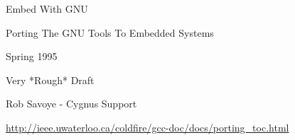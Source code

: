\secdown
{}
\secup

\secup

\label{portingnu}

Embed With GNU

Porting The GNU Tools To Embedded Systems

Spring 1995

Very *Rough* Draft

Rob Savoye - Cygnus Support

\url{http://ieee.uwaterloo.ca/coldfire/gcc-doc/docs/porting\_toc.html}